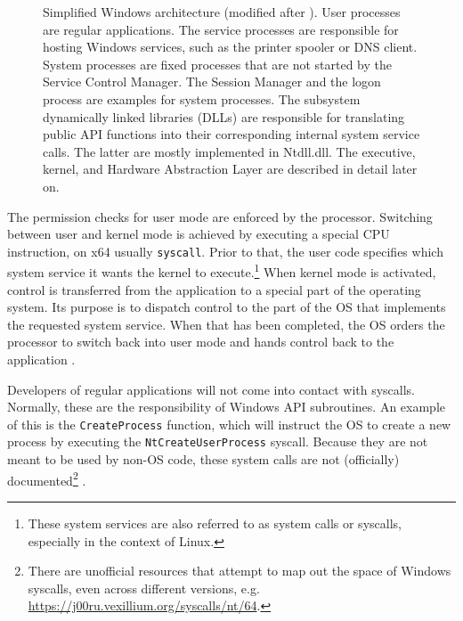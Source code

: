 \begin{figure}[htb!]
	\caption[
		Simplified Windows architecture
	]{
		Simplified Windows architecture (modified after \cite{Yosifovich2017}).
		User processes are regular applications. The service processes are responsible for hosting Windows services, such as the printer spooler or DNS client. System processes are fixed processes that are not started by the Service Control Manager. The Session Manager and the logon process are examples for system processes.
		The subsystem dynamically linked libraries (DLLs) are responsible for translating public API functions into their corresponding internal system service calls. The latter are mostly implemented in Ntdll.dll.
		The executive, kernel, and Hardware Abstraction Layer are described in detail later on. 
	}
	\label{fig:background.kerneldriver.winarchitecture}
\end{figure}

The permission checks for user mode are enforced by the processor. Switching between user and kernel mode is achieved by executing a special CPU instruction, on x64 usually \texttt{syscall}. Prior to that, the user code specifies which system service it wants the kernel to execute.\footnote{\label{fn:background.kerneldriver.syscalls} These system services are also referred to as system calls or syscalls, especially in the context of Linux.} When kernel mode is activated, control is transferred from the application to a special part of the operating system. Its purpose is to dispatch control to the part of the OS that implements the requested system service. When that has been completed, the OS orders the processor to switch back into user mode and hands control back to the application \cite{Yosifovich2017}.

Developers of regular applications will not come into contact with syscalls. Normally, these are the responsibility of Windows API subroutines. An example of this is the \texttt{CreateProcess} function, which will instruct the OS to create a new process by executing the \texttt{NtCreateUserProcess} syscall. Because they are not meant to be used by non-OS code, these system calls are not (officially) documented\footnote{\label{fn:background.kerneldriver.syscalldoc} There are unofficial resources that attempt to map out the space of Windows syscalls, even across different versions, e.g. \url{https://j00ru.vexillium.org/syscalls/nt/64}.} \cite{Yosifovich2017}.

